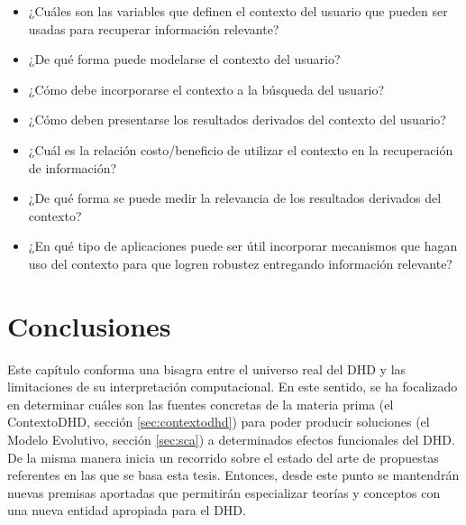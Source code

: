 \begin{itemize}
\item ¿Cuáles son las variables que definen el contexto del usuario que pueden
ser usadas para recuperar información relevante?
\item ¿De qué forma puede modelarse el contexto del usuario?
\item ¿Cómo debe incorporarse el contexto a la búsqueda del usuario?
\item ¿Cómo deben presentarse los resultados derivados del contexto del usuario?
\item ¿Cuál es la relación costo/beneficio de utilizar el contexto en la
recuperación de información?
\item ¿De qué forma se puede medir la relevancia de los resultados derivados del
contexto?
\item ¿En qué tipo de aplicaciones puede ser útil incorporar mecanismos que
hagan uso del contexto para que logren robustez entregando información
relevante?
\end{itemize}


\section{Conclusiones}

Este capítulo conforma una bisagra entre el universo real del DHD y
las limitaciones de su interpretación computacional. En este sentido, se ha focalizado en determinar cuáles son las fuentes concretas de la
materia prima (el ContextoDHD, sección \ref{sec:contextodhd}) para poder
producir soluciones (el Modelo Evolutivo, sección \ref{sec:sca})
a determinados efectos funcionales del DHD. De la misma manera inicia un
recorrido sobre el estado del arte de propuestas referentes en las que se basa
esta tesis. Entonces, desde este punto se mantendrán nuevas premisas aportadas
que permitirán especializar teorías y conceptos con una nueva entidad
apropiada para el DHD.
